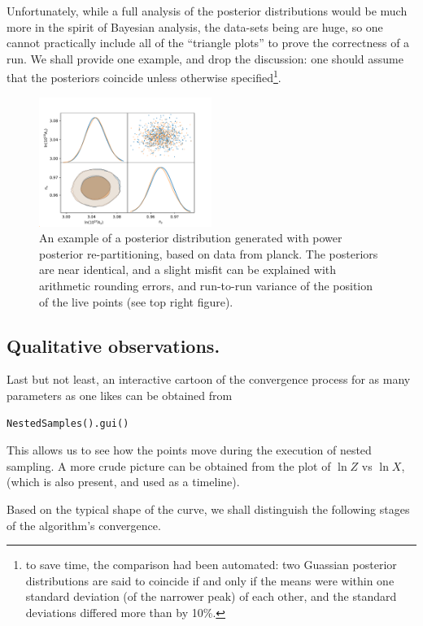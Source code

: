 \documentclass[usenatbib]{mnras}
\begin{document}
Unfortunately, while a full analysis of the posterior distributions
would be much more in the spirit of Bayesian analysis, the data-sets
being are huge, so one cannot practically include all of
the ``triangle plots'' to prove the correctness of a run. We shall
provide one example, and drop the discussion: one should assume
that the posteriors coincide unless otherwise specified\footnote{to save time, the comparison had been automated: two Guassian
posterior distributions are said to coincide if and only if the means
were within one standard deviation (of the narrower peak) of each
other, and the standard deviations differed more than by 10\%.}. 

\begin{figure}
 \includegraphics[width=0.5\textwidth]{./illustrations/misfit.pdf}
\caption{\label{org05733a8}
An example of a posterior distribution generated with power posterior re-partitioning, based on data from planck. The posteriors are near identical, and a slight misfit can be explained with arithmetic rounding errors, and run-to-run variance of the position of the live points (see top right figure).}
\end{figure}




\subsection{Qualitative observations.}
\label{sec:org6157dd9}
Last but not least, an interactive cartoon of the convergence
process for as many parameters as one likes can be obtained from

\begin{verbatim}
NestedSamples().gui()
\end{verbatim}
This allows us to see how the points move during the execution of
nested sampling. A more crude picture can be obtained from the plot
of \(\ln Z\) vs \(\ln X\), (which is also present, and used as a
timeline).

Based on the typical shape of the curve, we shall distinguish the
following stages of the algorithm's convergence. 
\end{document}
